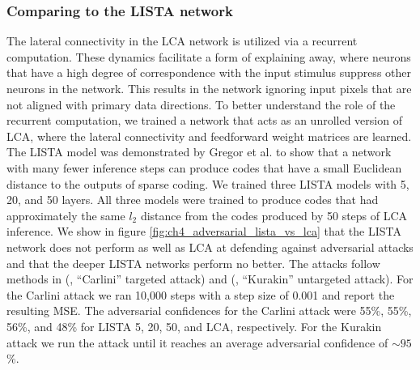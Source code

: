 \subsubsection{Comparing to the LISTA network}
The lateral connectivity in the LCA network is utilized via a recurrent computation. These dynamics facilitate a form of explaining away, where neurons that have a high degree of correspondence with the input stimulus suppress other neurons in the network. This results in the network ignoring input pixels that are not aligned with primary data directions. To better understand the role of the recurrent computation, we trained a network that acts as an unrolled version of LCA, where the lateral connectivity and feedforward weight matrices are learned. The LISTA model was demonstrated by Gregor et al. \citeyearpar{gregor2010learning} to show that a network with many fewer inference steps can produce codes that have a small Euclidean distance to the outputs of sparse coding. We trained three LISTA models with 5, 20, and 50 layers. All three models were trained to produce codes that had approximately the same $l_{2}$ distance from the codes produced by 50 steps of LCA inference. We show in figure \ref{fig:ch4_adversarial_lista_vs_lca} that the LISTA network does not perform as well as LCA at defending against adversarial attacks and that the deeper LISTA networks perform no better. The attacks follow methods in (\cite{carlini2017towards}, ``Carlini'' targeted attack) and (\cite{kurakin2016adversarial}, ``Kurakin'' untargeted attack). For the Carlini attack we ran 10,000 steps with a step size of 0.001 and report the resulting MSE. The adversarial confidences for the Carlini attack were 55\%, 55\%, 56\%, and 48\% for LISTA 5, 20, 50, and LCA, respectively. For the Kurakin attack we run the attack until it reaches an average adversarial confidence of $\sim 95$\%. 

